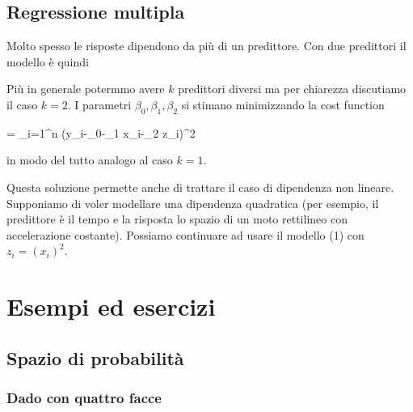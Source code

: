 \documentclass[11pt,openany]{book}
\begin{document}
\clearpage\section{Regressione multipla}
\label{regressione_lineare4}

Molto spesso le risposte dipendono da più di un predittore.
Con due predittori il modello è quindi


Più in generale potermmo avere $k$ predittori diversi ma per chiarezza discutiamo il caso $k=2$.
I parametri $\beta_0,\beta_1,\beta_2$ si stimano minimizzando la cost function

{=}
{\sum_{i=1}^n (y_i-\beta_0-\beta_1 x_i-\beta_2 z_i)^2}

in modo del tutto analogo al caso $k=1$.

Questa soluzione permette anche di trattare il caso di dipendenza non lineare.
Supponiamo di voler modellare una dipendenza quadratica (per esempio, il predittore è il tempo e la risposta lo spazio di un moto rettilineo con accelerazione costante).
Possiamo continuare ad usare il modello (1) con $z_i=(x_i)^2$.



\chapter{Esempi ed esercizi}
\pagestyle{plain}
\label{ch2}


\clearpage\section{Spazio di probabilità}

\subsection{Dado con quattro facce}
\label{tetraedro}
\end{document}
